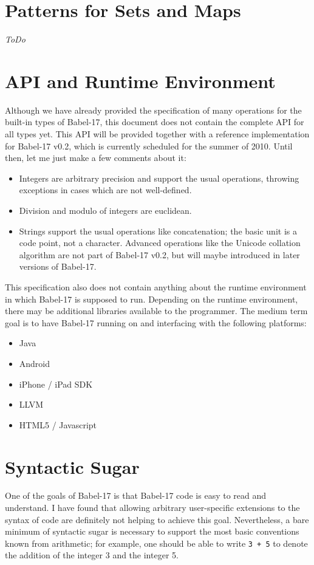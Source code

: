 \documentclass[11pt]{amsart}
\begin{document}
\section{Patterns for Sets and Maps}\label{sec-setmap-patterns}
\emph{ToDo} 

\section{API and Runtime Environment}
Although we have already provided the specification of many operations for the built-in types of Babel-17, this document does not contain the complete API for all types yet. This API will be provided together with a reference implementation for Babel-17 v0.2, which is currently scheduled for the summer of 2010. Until then, let me just make a few comments about it:
\begin{itemize}
\item Integers are arbitrary precision and support the usual operations, throwing exceptions in cases which are not well-defined. 
\item Division and modulo of integers are euclidean. 
\item Strings support the usual operations like concatenation; the basic unit is a code point, not a character. Advanced operations like the Unicode collation algorithm are not part of Babel-17 v0.2, but will maybe introduced in later versions of Babel-17.
\end{itemize}
This specification also does not contain anything about the runtime environment in which Babel-17 is supposed to run. Depending on the runtime environment, there may be additional libraries available to the programmer. 
The medium term goal is to have Babel-17 running on and interfacing with the following platforms:
\begin{itemize}
\item Java
\item Android
\item iPhone / iPad SDK
\item LLVM
\item HTML5 / Javascript 
\end{itemize}

\section{Syntactic Sugar}
One of the goals of Babel-17 is that Babel-17 code is easy to read and understand. I have found that allowing arbitrary user-specific extensions to the syntax of code are definitely not helping to achieve this goal. Nevertheless, a bare minimum of syntactic sugar is necessary to support the most basic conventions known from arithmetic; for example, one should be able to write \texttt{3 + 5} to denote the addition of the integer 3 and the integer 5.
\end{document}
